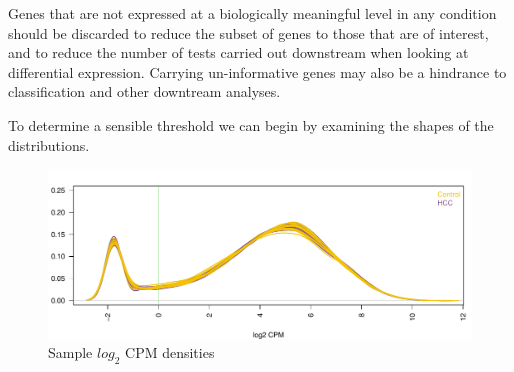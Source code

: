 \documentclass[
]{book}
\newenvironment{Shaded}{\begin{snugshade}}{\end{snugshade}}
\newcommand{\CommentTok}[1]{\textcolor[rgb]{0.56,0.35,0.01}{\textit{#1}}}
\newcommand{\ControlFlowTok}[1]{\textcolor[rgb]{0.13,0.29,0.53}{\textbf{#1}}}
\newcommand{\DataTypeTok}[1]{\textcolor[rgb]{0.13,0.29,0.53}{#1}}
\newcommand{\DecValTok}[1]{\textcolor[rgb]{0.00,0.00,0.81}{#1}}
\newcommand{\FloatTok}[1]{\textcolor[rgb]{0.00,0.00,0.81}{#1}}
\newcommand{\KeywordTok}[1]{\textcolor[rgb]{0.13,0.29,0.53}{\textbf{#1}}}
\newcommand{\NormalTok}[1]{#1}
\newcommand{\OperatorTok}[1]{\textcolor[rgb]{0.81,0.36,0.00}{\textbf{#1}}}
\newcommand{\StringTok}[1]{\textcolor[rgb]{0.31,0.60,0.02}{#1}}
\begin{document}
Genes that are not expressed at a biologically
meaningful level in any condition should be discarded to reduce the
subset of genes to those that are of interest, and to reduce the number of tests
carried out downstream when looking at differential expression. Carrying
un-informative genes may also be a hindrance to classification and other
downtream analyses.

To determine a sensible threshold we can begin by examining the shapes of the distributions.

\begin{Shaded}
\end{Shaded}

\begin{figure}
\centering
\includegraphics{Static/figures/densityLcpm-1.pdf}
\caption{\label{fig:densityLcpm}Sample \(log_2\) CPM densities}
\end{figure}
\end{document}
